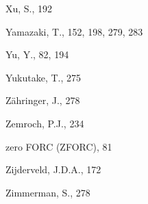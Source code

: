 \documentclass[,plain]{tauxe}
\begin{document}
\begin{theindex}
  \indexspace

  \item Xu, S., 192

  \indexspace

  \item Yamazaki, T., 152, 198, 279, 283
  \item Yu, Y., 82, 194
  \item Yukutake, T., 275

  \indexspace

  \item Z\"ahringer, J., 278
  \item Zemroch, P.J., 234
  \item zero FORC (ZFORC), 81
  \item Zijderveld, J.D.A., 172
  \item Zimmerman, S., 278
\end{theindex}
\end{document}
